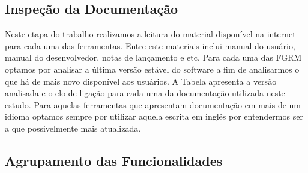 \begin{table}[ht]
	\centering
	\caption{Ferramentas e serviços da Internet selecionados.}
	\label{tab:ferramentas_selecionadas}
\end{table}

\subsection{Inspeção da Documentação}
\label{ssub:Inspeção da Documentação}

Neste etapa do trabalho realizamos a leitura do material disponível na internet para cada uma das
ferramentas. Entre este materiais inclui manual do usuário, manual do desenvolvedor, notas de
lançamento e etc. Para cada uma das FGRM optamos por analisar a última versão estável do software a
fim de analisarmos o que há de mais novo disponível aos usuários. A Tabela apresenta a versão
analisada e o elo de ligação para cada uma da documentação utilizada neste estudo. Para aquelas
ferramentas que apresentam documentação em mais de um idioma optamos sempre por utilizar aquela
escrita em inglês por entendermos ser a que possivelmente mais atualizada.

\subsection{Agrupamento das Funcionalidades}
\label{ssub:Agrupamento das Funcionalidades}

